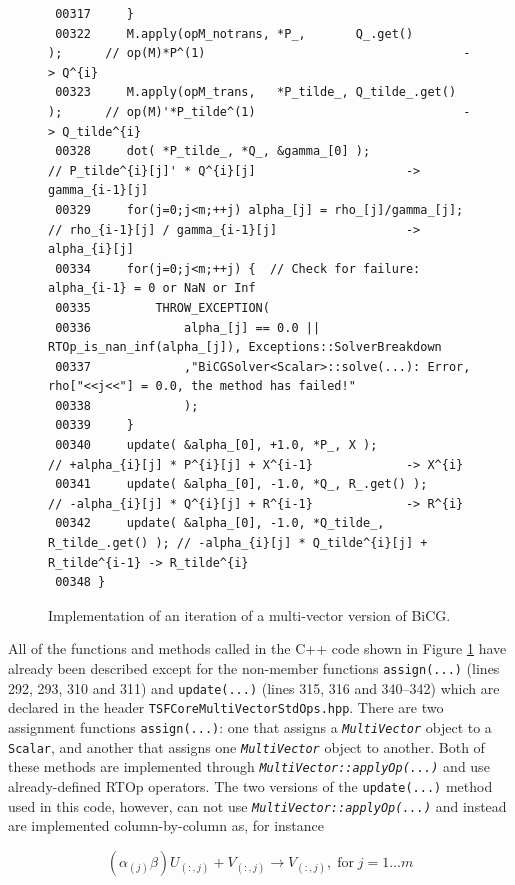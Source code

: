 {\begin{figure}
\begin{minipage}{\textwidth}
{\begin{verbatim}
 00317     }
 00322     M.apply(opM_notrans, *P_,       Q_.get()       );      // op(M)*P^(1)                                    -> Q^{i}
 00323     M.apply(opM_trans,   *P_tilde_, Q_tilde_.get() );      // op(M)'*P_tilde^(1)                             -> Q_tilde^{i}
 00328     dot( *P_tilde_, *Q_, &gamma_[0] );                     // P_tilde^{i}[j]' * Q^{i}[j]                     -> gamma_{i-1}[j]
 00329     for(j=0;j<m;++j) alpha_[j] = rho_[j]/gamma_[j];        // rho_{i-1}[j] / gamma_{i-1}[j]                  -> alpha_{i}[j]
 00334     for(j=0;j<m;++j) {  // Check for failure: alpha_{i-1} = 0 or NaN or Inf
 00335         THROW_EXCEPTION(
 00336             alpha_[j] == 0.0 || RTOp_is_nan_inf(alpha_[j]), Exceptions::SolverBreakdown
 00337             ,"BiCGSolver<Scalar>::solve(...): Error, rho["<<j<<"] = 0.0, the method has failed!"
 00338             );
 00339     }
 00340     update( &alpha_[0], +1.0, *P_, X );                    // +alpha_{i}[j] * P^{i}[j] + X^{i-1}             -> X^{i} 
 00341     update( &alpha_[0], -1.0, *Q_, R_.get() );             // -alpha_{i}[j] * Q^{i}[j] + R^{i-1}             -> R^{i} 
 00342     update( &alpha_[0], -1.0, *Q_tilde_, R_tilde_.get() ); // -alpha_{i}[j] * Q_tilde^{i}[j] + R_tilde^{i-1} -> R_tilde^{i} 
 00348 }
\end{verbatim}}
\end{minipage}
\caption{
\label{tsfcore:fig:BiCG_code}
Implementation of an iteration of a multi-vector version of BiCG.
}
\end{figure}
\esinglespace}
%
All of the functions and methods called in the C++ code shown in
Figure \ref{tsfcore:fig:BiCG_code} have already been described except
for the non-member functions \texttt{assign(...)} (lines 292, 293, 310
and 311) and \texttt{update(...)} (lines 315, 316 and 340--342) which
are declared in the header \texttt{TSFCore\-Multi\-Vector\-Std\-Ops.hpp}.
There are two assignment functions \texttt{assign(...)}: one that
assigns a \texttt{\textit{Multi\-Vector}} object to a \texttt{Scalar},
and another that assigns one \texttt{\textit{Multi\-Vector}} object to
another.  Both of these methods are implemented through
\texttt{\textit{Multi\-Vector\-::applyOp(\-...)}} and use already-defined
RTOp operators.  The two versions of the \texttt{update(...)} method
used in this code, however, can not use
\texttt{\textit{Multi\-Vector\-::applyOp(\-...)}} and instead are
implemented column-by-column as, for instance

\[
(\alpha_{(j)} \beta) U_{(:,j)} + V_{(:,j)} \rightarrow V_{(:,j)}, \; \mbox{for} \; j = 1 \ldots m
\]

